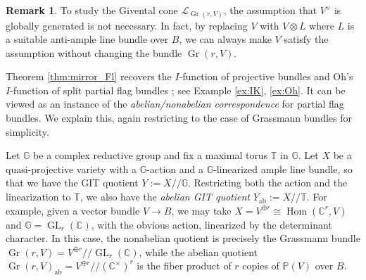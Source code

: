 \documentclass[a4paper,12pt]{amsart}
\numberwithin{equation}{section}
\theoremstyle{definition}
\newtheorem{remark}[theorem]{Remark}
\newcommand{\C}{\mathbb{C}}
\newcommand{\G}{\mathbb{G}}
\newcommand{\PP}{\mathbb{P}}
\newcommand{\T}{\mathbb{T}}
\newcommand{\cL}{\mathcal{L}}
\newcommand{\Gr}{\operatorname{Gr}}
\newcommand{\GL}{\operatorname{GL}}
\begin{document}
\begin{remark}
    To study the Givental cone $\cL_{\Gr(r,V)}$, the assumption that $V^\vee$ is globally generated is not necessary.
    In fact, by replacing $V$ with $V\otimes L$ where $L$ is a suitable anti-ample line bundle over $B$, we can always make $V$ satisfy the assumption without changing the bundle $\Gr(r,V)$.
\end{remark}

Theorem \ref{thm:mirror_Fl} recovers the $I$-function of projective bundles \cite[Theorem 3.3]{IK:quantum} and Oh's $I$-function of split partial flag bundles \cite[Theorem 1.1]{Oh:split_flag_bundle}; see Example \ref{ex:IK}, \ref{ex:Oh}. It can be viewed as an instance of the \emph{abelian/nonabelian correspondence} for partial flag bundles. We explain this, again restricting to the case of Grassmann bundles for simplicity. 

Let $\G$ be a complex reductive group and fix a maximal torus $\T$ in $\G$. Let $X$ be a quasi-projective variety with a $\G$-action and a $\G$-linearized ample line bundle, so that we have the GIT quotient $Y:=X/\!/\G$. Restricting both the action and the linearization to $\T$, we also have the \emph{abelian GIT quotient} $Y_{\operatorname{ab}}:=X/\!/\T$. For example, given a vector bundle $V\to B$, we may take $X=V^{\oplus r}\cong\operatorname{Hom}(\C^r,V)$ and $\G=\GL_r(\C)$, with the obvious action, linearized by the determinant character. In this case, the nonabelian quotient is precisely the Grassmann bundle $\Gr(r,V)=V^{\oplus r}/\!/\GL_r(\C)$, while the abelian quotient
$\Gr(r,V)_{\operatorname{ab}}=V^{\oplus r}/\!/(\C^\times)^r$ is the fiber product of $r$ copies of $\PP(V)$ over $B$.
\end{document}
